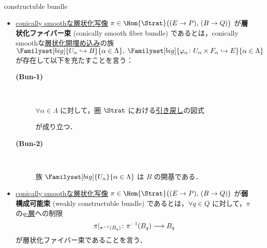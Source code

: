 \documentclass[TQFT_main]{subfiles}
\begin{document}
\begin{mydef}[label=def:cbl,breakable]{constructuble bundle}
    \begin{itemize}
        \item \hyperref[def:c-smooth-map]{conically smoothな層状化写像} $\pi \in \Hom{\Strat}\bigl( (E \to P),\, (B \to Q) \bigr)$ が\textbf{層状化ファイバー束} (conically smooth fiber bundle) であるとは，conically smoothな\hyperref[def:strat-emb]{層状化開埋め込み}の族 $\Familyset[big]{U_\alpha \hookrightarrow B}{\alpha \in \Lambda},\; \Familyset[big]{\varphi_\alpha \colon U_\alpha \times F_\alpha \hookrightarrow E}{\alpha \in \Lambda}$ が存在して以下を充たすことを言う：
        \begin{description}
            \item[\textbf{(Bun-1)}]　
            
            $\forall \alpha \in \Lambda$ に対して，圏 $\Strat$ における\hyperref[def:pullback-pushout]{引き戻し}の図式
            
            \begin{center}
            \end{center}
            が成り立つ．

            \item[\textbf{(Bun-2)}]　
            
            族 $\Familyset[big]{U_\alpha}{\alpha \in \Lambda}$ は $B$ の開基である．
        \end{description}
        
        \item \hyperref[def:c-smooth-map]{conically smoothな層状化写像} $\pi \in \Hom{\Strat}\bigl( (E \to P),\, (B \to Q) \bigr)$ が\textbf{弱構成可能束} (weakly constructuble bundle) であるとは，$\forall q \in Q$ に対して，$\pi$ の\hyperref[def:stratified-space]{$q$-層}への制限
        \begin{align}
            \pi|_{\pi^{-1}(B_q)} \colon \pi^{-1}(B_q) \longrightarrow B_q
        \end{align}
        が層状化ファイバー束であることを言う．


\end{itemize}
\end{mydef}
\end{document}
